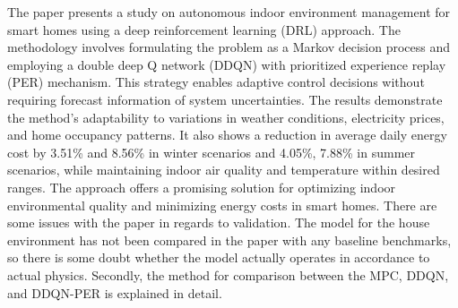 \documentclass[
]{article}
\begin{document}
The paper presents a study on autonomous indoor environment management
for smart homes using a deep reinforcement learning (DRL) approach. The
methodology involves formulating the problem as a Markov decision
process and employing a double deep Q network (DDQN) with prioritized
experience replay (PER) mechanism. This strategy enables adaptive
control decisions without requiring forecast information of system
uncertainties. The results demonstrate the method's adaptability to
variations in weather conditions, electricity prices, and home occupancy
patterns. It also shows a reduction in average daily energy cost by
3.51\% and 8.56\% in winter scenarios and 4.05\%, 7.88\% in summer
scenarios, while maintaining indoor air quality and temperature within
desired ranges. The approach offers a promising solution for optimizing
indoor environmental quality and minimizing energy costs in smart homes.
There are some issues with the paper in regards to validation. The model
for the house environment has not been compared in the paper with any
baseline benchmarks, so there is some doubt whether the model actually
operates in accordance to actual physics. Secondly, the method for
comparison between the MPC, DDQN, and DDQN-PER is explained in detail.
\end{document}
